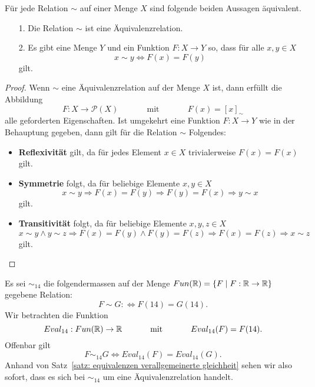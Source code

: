     \begin{satz}\label{satz: equivalenzen verallgemeinerte gleichheit}
    Für jede Relation $\sim$ auf einer Menge $X$ sind folgende beiden Aussagen äquivalent.
    \begin{enumerate}
    \item[1.] Die Relation $\sim$ ist eine Äquivalenzrelation.
    \item[2.] Es gibt eine Menge $Y$ und ein Funktion $F:X\to Y$ so, dass für alle $x,y\in X$
    \[
    x\sim y\Leftrightarrow F(x)=F(y)
    \]
    gilt.
    \end{enumerate}
    \end{satz}
    \begin{proof}
    Wenn $\sim$ eine Äquivalenzrelation auf der Menge $X$ ist, dann erfüllt die Abbildung
    \[
    F:X\to\mathcal{P}(X)\phantom{abstand}\text{mit} \phantom{abstand} F(x)=[x]_\sim
    \]
    alle geforderten Eigenschaften. Ist umgekehrt eine Funktion $F:X\to Y$ wie in der Behauptung gegeben, dann gilt für die Relation $\sim$ Folgendes:
    \begin{itemize}
    \item\textbf{Reflexivität} gilt, da für jedes Element $x\in X$ trivialerweise $F(x)=F(x)$ gilt.
    \item \textbf{Symmetrie} folgt, da für beliebige Elemente $x,y\in X$
    \[
    x\sim y\Rightarrow F(x)=F(y)\Rightarrow F(y)=F(x)\Rightarrow y\sim x
    \]
    gilt.
    \item\textbf{Transitivität} folgt, da für beliebige Elemente $x,y,z\in X$
    \[
    x\sim y\land y\sim z\Rightarrow F(x)=F(y)\land F(y)=F(z)\Rightarrow F(x)=F(z)\Rightarrow  x\sim z
    \]
    gilt.
    \end{itemize}
    \end{proof}



    \begin{bsp}
    Es sei $\sim_{14}$ die folgendermassen auf der Menge $Fun(\mathbb{R})=\{F\mid F:\mathbb{R}\to\mathbb{R}\}$ gegebene Relation:
    \[
    F\sim G:\Leftrightarrow F(14)=G(14).
    \]
    Wir betrachten die Funktion
    \[
    Eval_{14}:Fun(\mathbb{R})\to \mathbb{R}\phantom{abstand}\text{mit}\phantom{abstand}Eval_{14}(F)=F(14).
    \]
    Offenbar gilt
    \[
    F\sim_{14}G\Leftrightarrow Eval_{14}(F)=Eval_{14}(G).
    \]
    Anhand von Satz~\ref{satz: equivalenzen verallgemeinerte gleichheit} sehen wir also sofort, dass es sich bei $\sim_{14}$ um eine Äquivalenzrelation handelt.
    \end{bsp}

